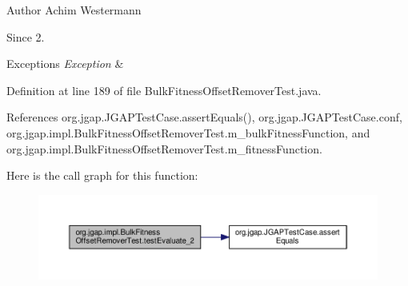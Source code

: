 \begin{DoxyAuthor}{Author}
Achim Westermann 
\end{DoxyAuthor}
\begin{DoxySince}{Since}
2. 
\end{DoxySince}

\begin{DoxyExceptions}{Exceptions}
{\em Exception} & \\
\hline
\end{DoxyExceptions}


Definition at line 189 of file Bulk\-Fitness\-Offset\-Remover\-Test.\-java.



References org.\-jgap.\-J\-G\-A\-P\-Test\-Case.\-assert\-Equals(), org.\-jgap.\-J\-G\-A\-P\-Test\-Case.\-conf, org.\-jgap.\-impl.\-Bulk\-Fitness\-Offset\-Remover\-Test.\-m\-\_\-bulk\-Fitness\-Function, and org.\-jgap.\-impl.\-Bulk\-Fitness\-Offset\-Remover\-Test.\-m\-\_\-fitness\-Function.



Here is the call graph for this function\-:
\nopagebreak
\begin{figure}[H]
\begin{center}
\leavevmode
\includegraphics[width=350pt]{classorg_1_1jgap_1_1impl_1_1_bulk_fitness_offset_remover_test_a83d074f246bde5580fd12942d5737bbc_cgraph}
\end{center}
\end{figure}


